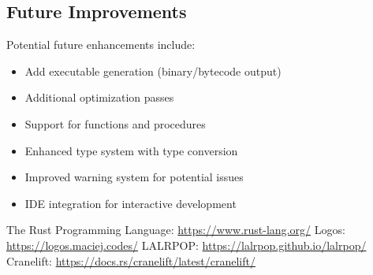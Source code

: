 \documentclass[12pt,a4paper]{article}
\begin{document}
\subsection{Future Improvements}
Potential future enhancements include:
\begin{itemize}
	\item Add executable generation (binary/bytecode output)
	\item Additional optimization passes
	\item Support for functions and procedures
	\item Enhanced type system with type conversion
	\item Improved warning system for potential issues
	\item IDE integration for interactive development
\end{itemize}


\begin{thebibliography}{9}
	 The Rust Programming Language: \url{https://www.rust-lang.org/}
	 Logos: \url{https://logos.maciej.codes/}
	 LALRPOP: \url{https://lalrpop.github.io/lalrpop/}
	 Cranelift: \url{https://docs.rs/cranelift/latest/cranelift/}
\end{thebibliography}
\end{document}

